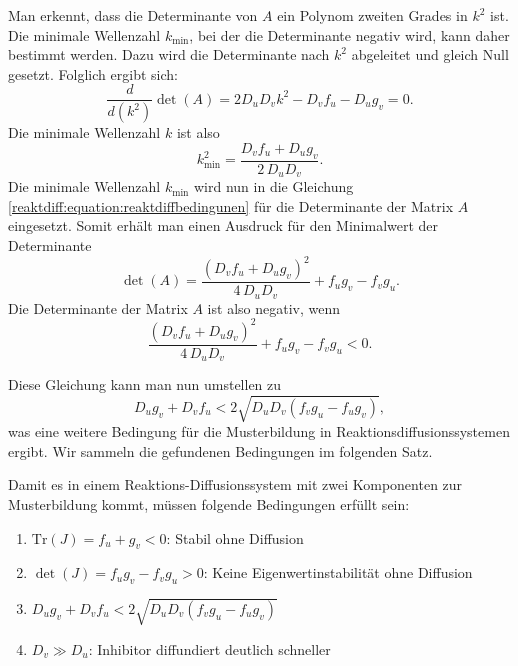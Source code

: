 Man erkennt, dass die Determinante von \(A\) ein Polynom zweiten Grades in \(k^2\) ist.  
Die minimale Wellenzahl \(k_{\text{min}}\), bei der die Determinante negativ wird, kann daher bestimmt werden.  
Dazu wird die Determinante nach \(k^2\) abgeleitet und gleich Null gesetzt.  
Folglich ergibt sich:
\begin{equation*}
    \frac{d}{d \left(k^2\right)} \det(A) = 2 D_u D_v k^2 - D_v f_u - D_u g_v = 0.
\end{equation*}
Die minimale Wellenzahl \(k\) ist also
\begin{equation*}
    k^2_{\text{min}} = \frac{D_v f_u + D_u g_v}{2\, D_u D_v}.
\end{equation*}
Die minimale Wellenzahl \(k_{\text{min}}\) wird nun in die Gleichung \eqref{reaktdiff:equation:reaktdiffbedingunen} für die Determinante der Matrix \(A\) eingesetzt.
Somit erhält man einen Ausdruck für den Minimalwert der Determinante
\begin{equation*}
    \det(A) = \frac{(D_v f_u + D_u g_v)^2}{4\, D_u D_v} + f_u g_v - f_v g_u.
\end{equation*}
Die Determinante der Matrix \(A\) ist also negativ, wenn
\begin{equation*}
    \frac{(D_v f_u + D_u g_v)^2}{4\, D_u D_v} + f_u g_v - f_v g_u < 0.
\end{equation*}

Diese Gleichung kann man nun umstellen zu
\begin{equation*}
    D_u g_v+D_v f_u < 2\!\sqrt{D_u D_v(f_v g_u - f_u g_v)} ,
\end{equation*}
was eine weitere Bedingung für die Musterbildung in Reaktionsdiffusionssystemen ergibt.
Wir sammeln die gefundenen Bedingungen im folgenden Satz.
\begin{satz}
\label{reaktdiff:satz:bedingungen}
Damit es in einem Reaktions-Diffusionssystem mit zwei Komponenten zur Musterbildung kommt, müssen folgende Bedingungen erfüllt sein:
\begin{enumerate}
    \item \(\text{Tr}(J) = f_u + g_v < 0\): Stabil ohne Diffusion
    \item \(\det(J) = f_u g_v - f_v g_u > 0\): Keine Eigenwertinstabilität ohne Diffusion
    \item \(D_u g_v+D_v f_u < 2\!\sqrt{D_u D_v(f_v g_u - f_u g_v)}\)
    \item \(D_v \gg D_u\): Inhibitor diffundiert deutlich schneller
\end{enumerate}
\end{satz}

